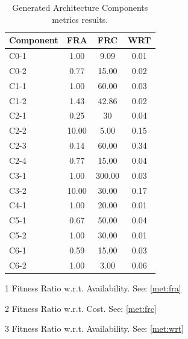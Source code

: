 \begin{table}[ht!b]
\centering
\begin{threeparttable}
	\begin{tabular}{|l|c|c|c|}
		\hline 
		\textbf{Component} & \textbf{FRA} & \textbf{FRC} & \textbf{WRT} \\ 
		\hline 
		C0-1 & 1.00 & 9.09 & 0.01 \\
		\hline 
		C0-2 & 0.77 & 15.00 & 0.02 \\
		\hline 
		C1-1 & 1.00 & 60.00 & 0.03 \\
		\hline 
		C1-2 & 1.43 & 42.86 & 0.02 \\
		\hline
		C2-1 & 0.25 & 30 & 0.04 \\
		\hline
		C2-2 & 10.00 & 5.00 & 0.15 \\
		\hline
		C2-3 & 0.14 & 60.00 & 0.34 \\
		\hline
		C2-4 & 0.77 & 15.00 & 0.04 \\
		\hline
		C3-1 & 1.00 & 300.00 & 0.03 \\
		\hline
		C3-2 & 10.00 & 30.00 & 0.17 \\
		\hline
		C4-1 & 1.00 & 20.00 & 0.01 \\
		\hline
		C5-1 & 0.67 & 50.00 & 0.04 \\
		\hline
		C5-2 & 1.00 & 30.00 & 0.01 \\
		\hline
		C6-1 & 0.59 & 15.00 & 0.03 \\
		\hline
		C6-2 & 1.00 & 3.00 & 0.06 \\
		\hline
	\end{tabular} 
	\begin{tablenotes}\footnotesize
	\item[1] Fitness Ratio w.r.t. Availability. See: \ref{met:fra}
	\item[2] Fitness Ratio w.r.t. Cost. See: \ref{met:frc}
	\item[3] Fitness Ratio w.r.t. Availability. See: \ref{met:wrt}
	\end{tablenotes}
\end{threeparttable}
	\caption[Generated Architecture Service Components Metrics]{Generated Architecture Components metrics results.}
	\label{tab:ag-comp-res}
\end{table}

